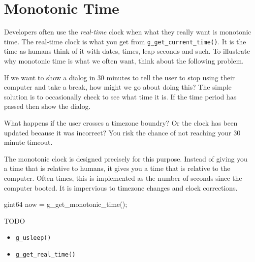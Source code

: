 \section{Monotonic Time}

Developers often use the \emph{real-time} clock when what they really want is monotonic time.
The real-time clock is what you get from \verb|g_get_current_time()|.
It is the time as humans think of it with dates, times, leap seconds and such.
To illustrate why monotonic time is what we often want, think about the following problem.

If we want to show a dialog in 30 minutes to tell the user to stop using their computer and take a break, how might we go about doing this?
The simple solution is to occasionally check to see what time it is.
If the time period has passed then show the dialog.

What happens if the user crosses a timezone boundry?
Or the clock has been updated because it was incorrect?
You risk the chance of not reaching your 30 minute timeout.


The monotonic clock is designed precisely for this purpose.
Instead of giving you a time that is relative to humans, it gives you a time that is relative to the computer.
Often times, this is implemented as the number of seconds since the computer booted.
It is impervious to timezone changes and clock corrections.

\begin{Terminal}
gint64 now = g_get_monotonic_time();
\end{Terminal}


TODO

\begin{itemize}
\item \verb|g_usleep()|
\item \verb|g_get_real_time()|
\end{itemize}
